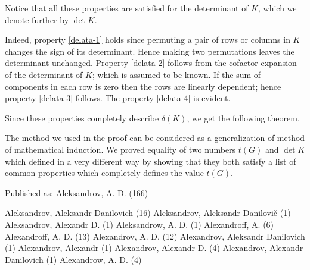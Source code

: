 Notice that all these properties are satisfied for the determinant of $K$, which we denote further by $\det K$.

Indeed, property \ref{delata-1} holds since permuting a pair of rows or columns in $K$ changes the sign of its determinant.
Hence making two permutations leaves the determinant unchanged.
Property \ref{delata-2} follows from the cofactor expansion of the determinant of $K$;
which is assumed to be known. 
If the sum of components in each row is zero then the rows are linearly dependent;
hence property \ref{delata-3} follows.
The property \ref{delata-4} is evident.

Since these properties completely describe $\delta(K)$, we get the following theorem.



The method we used in the proof can be considered as a generalization of method of mathematical induction.
We proved equality of two numbers $t(G)$ and $\det K$ which defined in a very different way by showing that they both satisfy a list of common properties which completely defines the value $t(G)$.











Published as: Aleksandrov, A. D. (166)

     Aleksandrov, Aleksandr Danilovich (16)
     Aleksandrov, Aleksandr Danilovič (1)
     Aleksandrov, Alexandr D. (1)
     Aleksandrow, A. D. (1)
     Alexandroff, A. (6)
     Alexandroff, A. D. (13)
     Alexandrov, A. D. (12)
     Alexandrov, Aleksandr Danilovich (1)
     Alexandrov, Alexandr (1)
     Alexandrov, Alexandr D. (4)
     Alexandrov, Alexandr Danilovich (1)
     Alexandrow, A. D. (4)
